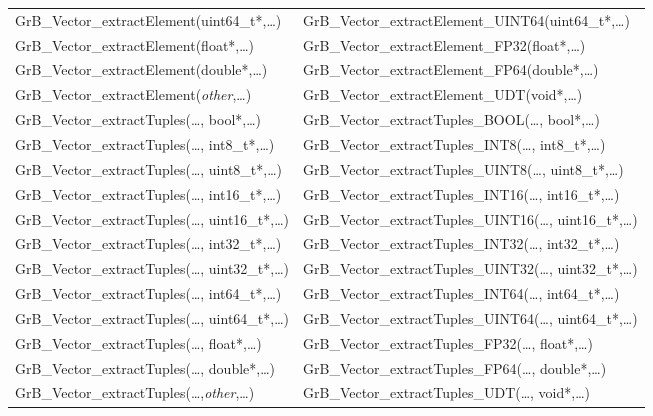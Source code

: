 \begin{table}[htb]
{\begin{tabular}{l|l}
{\sf GrB\_Vector\_extractElement(uint64\_t*,\ldots)}		& {\sf GrB\_Vector\_extractElement\_UINT64(uint64\_t*,\ldots)} \\
{\sf GrB\_Vector\_extractElement(float*,\ldots)}		& {\sf GrB\_Vector\_extractElement\_FP32(float*,\ldots)} \\
{\sf GrB\_Vector\_extractElement(double*,\ldots)}		& {\sf GrB\_Vector\_extractElement\_FP64(double*,\ldots)} \\
{\sf GrB\_Vector\_extractElement(\emph{other},\ldots)}		& {\sf GrB\_Vector\_extractElement\_UDT(void*,\ldots)} \\ \hline
{\sf GrB\_Vector\_extractTuples(\ldots, bool*,\ldots)}		& {\sf GrB\_Vector\_extractTuples\_BOOL(\ldots, bool*,\ldots)} \\
{\sf GrB\_Vector\_extractTuples(\ldots, int8\_t*,\ldots)}	& {\sf GrB\_Vector\_extractTuples\_INT8(\ldots, int8\_t*,\ldots)} \\
{\sf GrB\_Vector\_extractTuples(\ldots, uint8\_t*,\ldots)}	& {\sf GrB\_Vector\_extractTuples\_UINT8(\ldots, uint8\_t*,\ldots)} \\
{\sf GrB\_Vector\_extractTuples(\ldots, int16\_t*,\ldots)}	& {\sf GrB\_Vector\_extractTuples\_INT16(\ldots, int16\_t*,\ldots)} \\
{\sf GrB\_Vector\_extractTuples(\ldots, uint16\_t*,\ldots)}	& {\sf GrB\_Vector\_extractTuples\_UINT16(\ldots, uint16\_t*,\ldots)} \\
{\sf GrB\_Vector\_extractTuples(\ldots, int32\_t*,\ldots)}	& {\sf GrB\_Vector\_extractTuples\_INT32(\ldots, int32\_t*,\ldots)} \\
{\sf GrB\_Vector\_extractTuples(\ldots, uint32\_t*,\ldots)}	& {\sf GrB\_Vector\_extractTuples\_UINT32(\ldots, uint32\_t*,\ldots)} \\
{\sf GrB\_Vector\_extractTuples(\ldots, int64\_t*,\ldots)}	& {\sf GrB\_Vector\_extractTuples\_INT64(\ldots, int64\_t*,\ldots)} \\
{\sf GrB\_Vector\_extractTuples(\ldots, uint64\_t*,\ldots)}	& {\sf GrB\_Vector\_extractTuples\_UINT64(\ldots, uint64\_t*,\ldots)} \\
{\sf GrB\_Vector\_extractTuples(\ldots, float*,\ldots)}		& {\sf GrB\_Vector\_extractTuples\_FP32(\ldots, float*,\ldots)} \\
{\sf GrB\_Vector\_extractTuples(\ldots, double*,\ldots)}	& {\sf GrB\_Vector\_extractTuples\_FP64(\ldots, double*,\ldots)} \\
{\sf GrB\_Vector\_extractTuples(\ldots,\emph{other},\ldots)}	& {\sf GrB\_Vector\_extractTuples\_UDT(\ldots, void*,\ldots)} \\ \hline
\end{tabular}
}
\label{Tab:NonPolymorphic2}
\end{table}

